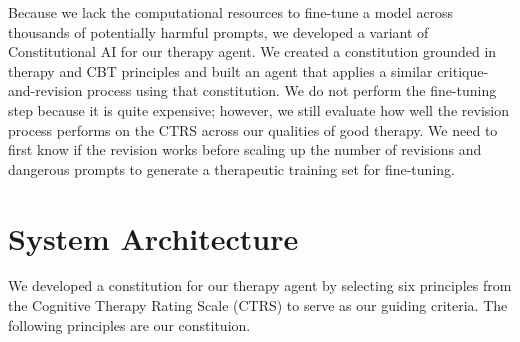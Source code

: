 \documentclass[twoside]{report}
\begin{document}
Because we lack the computational resources to fine-tune a model across thousands of potentially harmful prompts, we developed a variant of Constitutional AI for our therapy agent. We created a constitution grounded in therapy and CBT principles and built an agent that applies a similar critique-and-revision process using that constitution. We do not perform the fine-tuning step because it is quite expensive; however, we still evaluate how well the revision process performs on the CTRS across our qualities of good therapy. We need to first know if the revision works before scaling up the number of revisions and dangerous prompts to generate a therapeutic training set for fine-tuning.

\section{System Architecture}
We developed a constitution for our therapy agent by selecting six principles from the Cognitive Therapy Rating Scale (CTRS) to serve as our guiding criteria. The following principles are our constituion.
\end{document}
